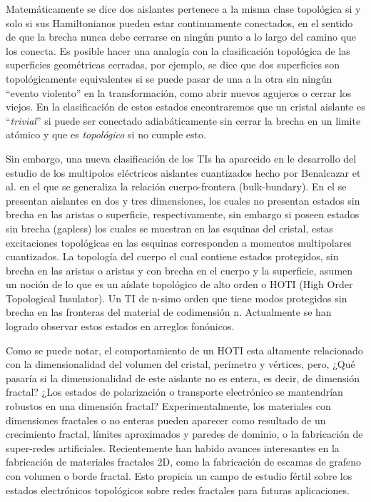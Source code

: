 Matemáticamente se dice dos aislantes pertenece a la misma clase topológica si y solo si sus Hamiltonianos pueden estar continuamente conectados, en el sentido de que la brecha nunca debe cerrarse en ningún punto a lo largo del camino que los conecta. Es posible hacer una analogía con la clasificación topológica de las superficies geométricas cerradas, por ejemplo, se dice que dos superficies son topológicamente equivalentes si se puede pasar de una a la otra sin ningún ``evento violento'' en la transformación, como abrir nuevos agujeros o cerrar los viejos. En la clasificación de estos estados encontraremos que un cristal aislante es ``\textit{trivial}'' si puede ser conectado adiabáticamente sin cerrar la brecha en un limite atómico y que es \textit{topológico} si no cumple esto.

Sin embargo, una nueva clasificación de los TIs ha aparecido en le desarrollo del estudio de los multipolos eléctricos aislantes cuantizados hecho por Benalcazar et al. \cite{Benalcazar2017}    en el que se generaliza la relación cuerpo-frontera (bulk-bundary). En el se presentan aislantes en dos y tres dimensiones, los cuales no presentan estados sin brecha en las aristas o superficie, respectivamente, sin embargo si poseen estados sin brecha (gapless) los cuales se muestran en las esquinas del cristal, estas excitaciones topológicas en las esquinas corresponden a momentos multipolares cuantizados.
La topología del cuerpo el cual contiene estados protegidos, sin brecha en las aristas o aristas y con brecha en el cuerpo y la superficie, asumen un noción de lo que es un aíslate topológico de alto orden o HOTI (High Order Topological Insulator). Un TI de n-simo orden que tiene modos protegidos sin brecha en las fronteras del material de codimensión n. Actualmente se han logrado observar estos estados en arreglos fonónicos.

Como se puede notar, el comportamiento de un HOTI esta altamente relacionado con la dimensionalidad del volumen del cristal, perímetro y vértices, pero, ¿Qué pasaría si la dimensionalidad de este aislante no es entera, es decir, de dimensión fractal? ¿Los estados de polarización o transporte electrónico se mantendrían robustos en una dimensión fractal? Experimentalmente, los materiales con dimensiones fractales o no enteras pueden aparecer como resultado de un crecimiento fractal, límites aproximados y paredes de dominio, o la fabricación de super-redes artificiales. Recientemente han habido avances interesantes en la fabricación de materiales fractales 2D, como la fabricación de escamas de grafeno con volumen o borde fractal. Esto propicia un campo de estudio fértil sobre los estados electrónicos topológicos sobre redes fractales para futuras aplicaciones.

